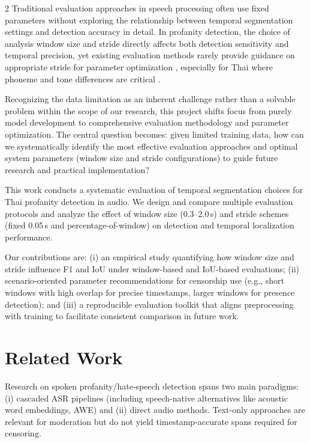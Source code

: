 \documentclass[11pt,a4paper]{article}
\begin{document}
\begin{multicols}{2}
Traditional evaluation approaches in speech processing often use fixed parameters without exploring the relationship between temporal segmentation settings and detection accuracy in detail. In profanity detection, the choice of analysis window size and stride directly affects both detection sensitivity and temporal precision, yet existing evaluation methods rarely provide guidance on appropriate stride for parameter optimization \cite{baevski2020wav2vec20frameworkselfsupervised}, especially for Thai where phoneme and tone differences are critical \cite{THEERAUMPON201113254,suwanbandit2024improving}.

Recognizing the data limitation as an inherent challenge rather than a solvable problem within the scope of our research, this project shifts focus from purely model development to comprehensive evaluation methodology and parameter optimization. The central question becomes: given limited training data, how can we systematically identify the most effective evaluation approaches and optimal system parameters (window size and stride configurations) to guide future research and practical implementation?

This work conducts a systematic evaluation of temporal segmentation choices for Thai profanity detection in audio. We design and compare multiple evaluation protocols and analyze the effect of window size (0.3--2.0\,s) and stride schemes (fixed 0.05\,s and percentage-of-window) on detection and temporal localization performance.

Our contributions are: (i) an empirical study quantifying how window size and stride influence F1 and IoU under window-based and IoU-based evaluations; (ii) scenario-oriented parameter recommendations for censorship use (e.g., short windows with high overlap for precise timestamps, larger windows for presence detection); and (iii) a reproducible evaluation toolkit that aligns preprocessing with training to facilitate consistent comparison in future work.

\section{Related Work}
Research on spoken profanity/hate-speech detection spans two main paradigms: (i) cascaded ASR pipelines (including speech-native alternatives like acoustic word embeddings, AWE) and (ii) direct audio methods. Text-only approaches \cite{Hemtanon_Phetkrachang_Yangyuen_2024,Aljumily2023,Davidson_Warmsley_Macy_Weber_2017} are relevant for moderation but do not yield timestamp-accurate spans required for censoring.


\end{multicols}
\end{document}
